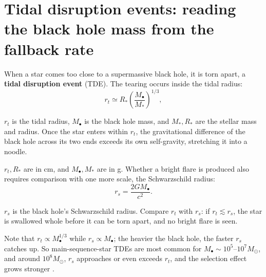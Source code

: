 \section{Tidal disruption events: reading the black hole mass from the fallback rate}
\label{sec:e20-tde}

When a star comes too close to a supermassive black hole, it is torn apart, a \textbf{tidal disruption event} (TDE). The tearing occurs inside the tidal radius:
\begin{equation}
  r_t\simeq R_\ast\left(\frac{M_\bullet}{M_\ast}\right)^{1/3},
  \label{eq:e20-tidal-radius}
\end{equation}
\begin{formulaexplain}
\(r_t\) is the tidal radius, \(M_\bullet\) is the black hole mass, and \(M_\ast,R_\ast\) are the stellar mass and radius. Once the star enters within \(r_t\), the gravitational difference of the black hole across its two ends exceeds its own self-gravity, stretching it into a noodle.
\end{formulaexplain}
\(r_t,R_\ast\) are in cm, and \(M_\bullet,M_\ast\) are in g. Whether a bright flare is produced also requires comparison with one more scale, the Schwarzschild radius:
\begin{equation}
  r_s=\frac{2GM_\bullet}{c^2}.
  \label{eq:e20-schwarzschild-radius-tde}
\end{equation}
\begin{formulaexplain}
\(r_s\) is the black hole's Schwarzschild radius. Compare \(r_t\) with \(r_s\): if \(r_t\lesssim r_s\), the star is swallowed whole before it can be torn apart, and no bright flare is seen.
\end{formulaexplain}
Note that \(r_t\propto M_\bullet^{1/3}\) while \(r_s\propto M_\bullet\); the heavier the black hole, the faster \(r_s\) catches up. So main-sequence-star TDEs are most common for \(M_\bullet\sim10^5\text{--}10^7M_\odot\), and around \(10^8M_\odot\), \(r_s\) approaches or even exceeds \(r_t\), and the selection effect grows stronger \citep{1988Natur.333..523R,2021ARA&A..59...21G}.

